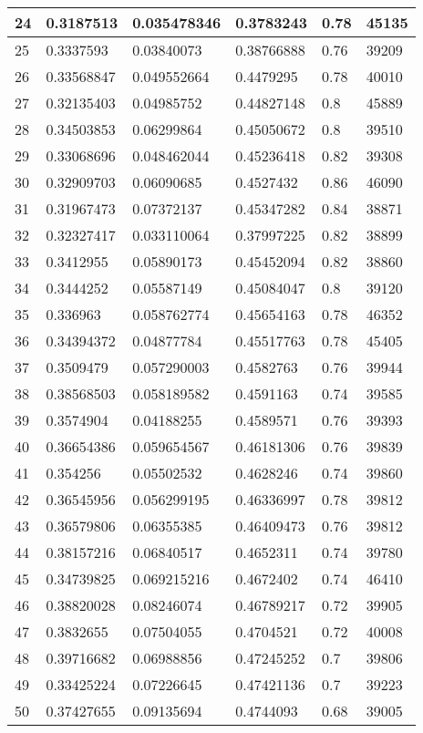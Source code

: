 \begin{longtable}{|l|l|l|l|l|l|}
24 & 0.3187513 & 0.035478346 & 0.3783243 & 0.78 & 45135 \\ \hline 
25 & 0.3337593 & 0.03840073 & 0.38766888 & 0.76 & 39209 \\ \hline 
26 & 0.33568847 & 0.049552664 & 0.4479295 & 0.78 & 40010 \\ \hline 
27 & 0.32135403 & 0.04985752 & 0.44827148 & 0.8 & 45889 \\ \hline 
28 & 0.34503853 & 0.06299864 & 0.45050672 & 0.8 & 39510 \\ \hline 
29 & 0.33068696 & 0.048462044 & 0.45236418 & 0.82 & 39308 \\ \hline 
30 & 0.32909703 & 0.06090685 & 0.4527432 & 0.86 & 46090 \\ \hline 
31 & 0.31967473 & 0.07372137 & 0.45347282 & 0.84 & 38871 \\ \hline 
32 & 0.32327417 & 0.033110064 & 0.37997225 & 0.82 & 38899 \\ \hline 
33 & 0.3412955 & 0.05890173 & 0.45452094 & 0.82 & 38860 \\ \hline 
34 & 0.3444252 & 0.05587149 & 0.45084047 & 0.8 & 39120 \\ \hline 
35 & 0.336963 & 0.058762774 & 0.45654163 & 0.78 & 46352 \\ \hline 
36 & 0.34394372 & 0.04877784 & 0.45517763 & 0.78 & 45405 \\ \hline 
37 & 0.3509479 & 0.057290003 & 0.4582763 & 0.76 & 39944 \\ \hline 
38 & 0.38568503 & 0.058189582 & 0.4591163 & 0.74 & 39585 \\ \hline 
39 & 0.3574904 & 0.04188255 & 0.4589571 & 0.76 & 39393 \\ \hline 
40 & 0.36654386 & 0.059654567 & 0.46181306 & 0.76 & 39839 \\ \hline 
41 & 0.354256 & 0.05502532 & 0.4628246 & 0.74 & 39860 \\ \hline 
42 & 0.36545956 & 0.056299195 & 0.46336997 & 0.78 & 39812 \\ \hline 
43 & 0.36579806 & 0.06355385 & 0.46409473 & 0.76 & 39812 \\ \hline 
44 & 0.38157216 & 0.06840517 & 0.4652311 & 0.74 & 39780 \\ \hline 
45 & 0.34739825 & 0.069215216 & 0.4672402 & 0.74 & 46410 \\ \hline 
46 & 0.38820028 & 0.08246074 & 0.46789217 & 0.72 & 39905 \\ \hline 
47 & 0.3832655 & 0.07504055 & 0.4704521 & 0.72 & 40008 \\ \hline 
48 & 0.39716682 & 0.06988856 & 0.47245252 & 0.7 & 39806 \\ \hline 
49 & 0.33425224 & 0.07226645 & 0.47421136 & 0.7 & 39223 \\ \hline 
50 & 0.37427655 & 0.09135694 & 0.4744093 & 0.68 & 39005 \\ \hline 
\end{longtable}